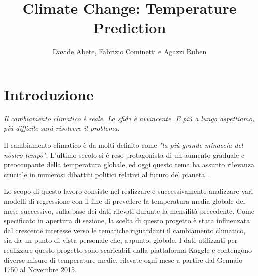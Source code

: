 \documentclass[12pt, a4paper, twocolumn]{article} %
\title{Climate Change: Temperature Prediction} %
\author{
	Davide Abete, Fabrizio Cominetti e Agazzi Ruben %
}
\begin{document}

\maketitle %

\thispagestyle{firstpage} %

\tableofcontents
\bigskip
\bigskip
\bigskip
\bigskip
\bigskip
{}


\section{Introduzione}
\textit{Il cambiamento climatico è reale. La sfida è avvincente. E più a lungo aspettiamo, più difficile sarà risolvere il problema.} \cite{climatequote}
\bigskip

Il cambiamento climatico è da molti definito come \textit{"la più grande minaccia del nostro tempo"}. L'ultimo secolo si è reso protagonista di un aumento graduale e preoccupante della temperatura globale, ed oggi questo tema ha assunto rilevanza cruciale in numerosi dibattiti politici relativi al futuro del pianeta \cite{climatepaper}. %

Lo scopo di questo lavoro consiste nel realizzare e successivamente analizzare vari modelli di regressione con il fine di prevedere la temperatura media globale del mese successivo, sulla base dei dati rilevati durante la mensilità precedente.
Come specificato in apertura di sezione, la scelta di questo progetto è stata influenzata dal crescente interesse verso le tematiche riguardanti il cambiamento climatico, sia da un punto di vista personale che, appunto, globale.
I dati utilizzati per realizzare questo progetto sono scaricabili dalla piattaforma Kaggle \cite{dataset} e contengono diverse misure di temperature medie, rilevate ogni mese a partire dal Gennaio 1750 al Novembre 2015.
\end{document}
